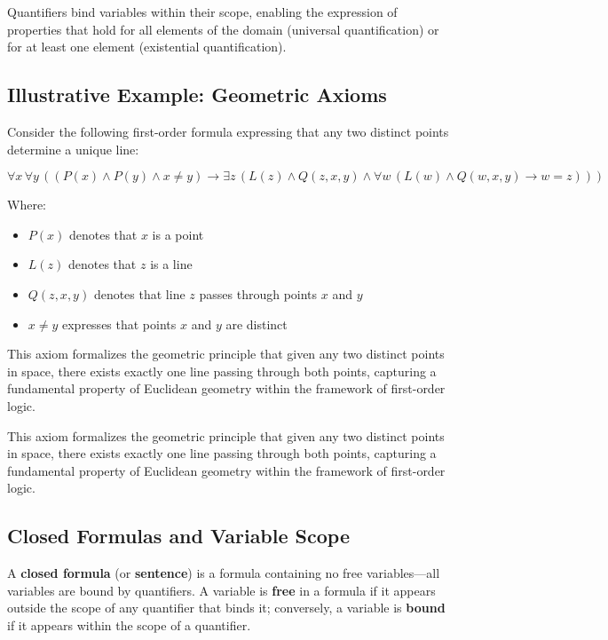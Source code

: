 \documentclass[11pt,a4paper]{article}
\theoremstyle{definition}
\theoremstyle{plain}
\theoremstyle{remark}
\begin{document}
Quantifiers bind variables within their scope, enabling the expression of properties that hold for all elements of the domain (universal quantification) or for at least one element (existential quantification).

\subsection{Illustrative Example: Geometric Axioms}

Consider the following first-order formula expressing that any two distinct points determine a unique line:

\[
\forall x \, \forall y \, \left( (P(x) \wedge P(y) \wedge x \neq y) \rightarrow \exists z \, (L(z) \wedge Q(z, x, y) \wedge \forall w \, (L(w) \wedge Q(w, x, y) \rightarrow w = z)) \right)
\]

Where:
\begin{itemize}
    \item $P(x)$ denotes that $x$ is a point
    \item $L(z)$ denotes that $z$ is a line
    \item $Q(z, x, y)$ denotes that line $z$ passes through points $x$ and $y$
    \item $x \neq y$ expresses that points $x$ and $y$ are distinct
\end{itemize}

This axiom formalizes the geometric principle that given any two distinct points in space, there exists exactly one line passing through both points, capturing a fundamental property of Euclidean geometry within the framework of first-order logic. 

This axiom formalizes the geometric principle that given any two distinct points in space, there exists exactly one line passing through both points, capturing a fundamental property of Euclidean geometry within the framework of first-order logic.

\subsection{Closed Formulas and Variable Scope}

A \textbf{closed formula} (or \textbf{sentence}) is a formula containing no free variables---all variables are bound by quantifiers. A variable is \textbf{free} in a formula if it appears outside the scope of any quantifier that binds it; conversely, a variable is \textbf{bound} if it appears within the scope of a quantifier.
\end{document}
